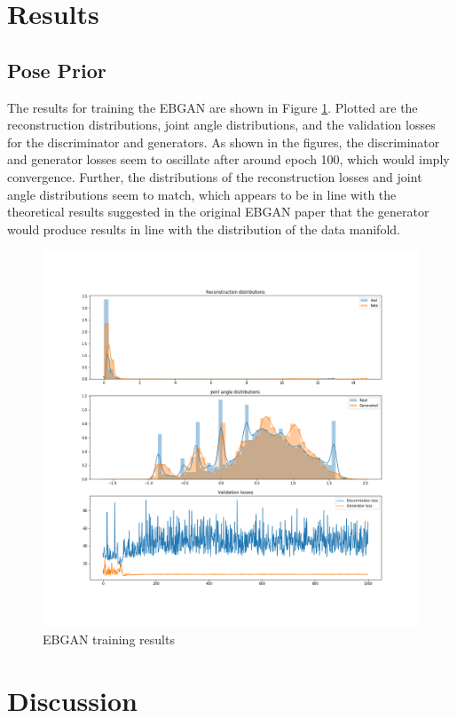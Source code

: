 \documentclass[10pt,twocolumn,letterpaper]{article}
\begin{document}
\section{Results}
\subsection{Pose Prior}
The results for training the EBGAN are shown in Figure \ref{fig:ganresults}. Plotted are the reconstruction distributions, joint angle distributions, and the validation losses for the discriminator and generators. As shown in the figures, the discriminator and generator losses seem to oscillate after around epoch 100, which would imply convergence. Further, the distributions of the reconstruction losses and joint angle distributions seem to match, which appears to be in line with the theoretical results suggested in the original EBGAN paper that the generator would produce results in line with the distribution of the data manifold.  
\begin{figure}[h]
\centering
\includegraphics[scale=0.45]{gan_res.png}
\caption{EBGAN training results}
\label{fig:ganresults}
\end{figure}
\section{Discussion}


{\small


}
\end{document}
